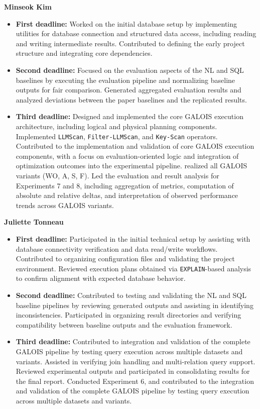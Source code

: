 \documentclass[11pt]{article}
\begin{document}
\noindent\textbf{Minseok Kim}
\begin{itemize}
  \item \textbf{First deadline:} Worked on the initial database setup by implementing utilities for database connection and structured data access, including reading and writing intermediate results. Contributed to defining the early project structure and integrating core dependencies.
  \item \textbf{Second deadline:} Focused on the evaluation aspects of the NL and SQL baselines by executing the evaluation pipeline and normalizing baseline outputs for fair comparison. Generated aggregated evaluation results and analyzed deviations between the paper baselines and the replicated results.
  \item \textbf{Third deadline:} Designed and implemented the core GALOIS execution architecture, including logical and physical planning components. Implemented \texttt{LLMScan}, \texttt{Filter-LLMScan}, and \texttt{Key-Scan} operators. Contributed to the implementation and validation of core GALOIS execution components, with a focus on evaluation-oriented logic and integration of optimization outcomes into the experimental pipeline. realized all GALOIS variants (WO, A, S, F). Led the evaluation and result analysis for Experiments 7 and 8, including aggregation of metrics, computation of absolute and relative deltas, and interpretation of observed performance trends across GALOIS variants.
\end{itemize}

\noindent\textbf{Juliette Tonneau}
\begin{itemize}
  \item \textbf{First deadline:} Participated in the initial technical setup by assisting with database connectivity verification and data read/write workflows. Contributed to organizing configuration files and validating the project environment. Reviewed execution plans obtained via \texttt{EXPLAIN}-based analysis to confirm alignment with expected database behavior.
  \item \textbf{Second deadline:} Contributed to testing and validating the NL and SQL baseline pipelines by reviewing generated outputs and assisting in identifying inconsistencies. Participated in organizing result directories and verifying compatibility between baseline outputs and the evaluation framework.
  \item \textbf{Third deadline:} Contributed to integration and validation of the complete GALOIS pipeline by testing query execution across multiple datasets and variants. Assisted in verifying join handling and multi-relation query support. Reviewed experimental outputs and participated in consolidating results for the final report. Conducted Experiment 6, and contributed to the integration and validation of the complete GALOIS pipeline by testing query execution across multiple datasets and variants.
\end{itemize}
\end{document}

